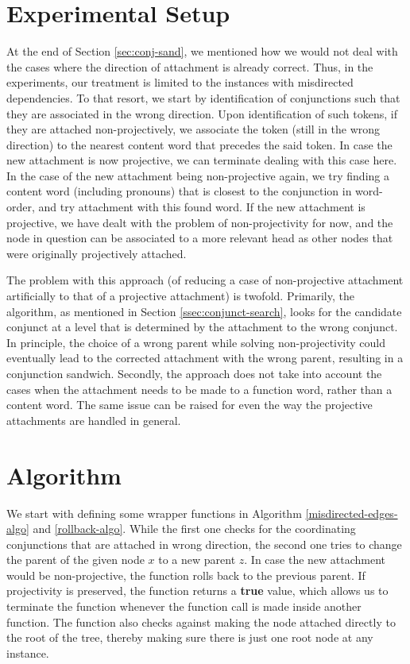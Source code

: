 \section{Experimental Setup}
\label{ssec:conj_head_experiment}

At the end of Section \ref{sec:conj-sand}, we mentioned how we would not deal with the cases where the direction of attachment is already correct. Thus, in the experiments, our treatment is limited to the instances with misdirected dependencies. To that resort, we start by identification of conjunctions such that they are associated in the wrong direction. Upon identification of such tokens, if they are attached non-projectively, we associate the token (still in the wrong direction) to the nearest content word that precedes the said token. In case the new attachment is now projective, we can terminate dealing with this case here. In the case of the new attachment being non-projective again, we try finding a content word (including pronouns) that is closest to the conjunction in word-order, and try attachment with this found word. If the new attachment is projective, we have dealt with the problem of non-projectivity for now, and the node in question can be associated to a more relevant head as other nodes that were originally projectively attached.

The problem with this approach (of reducing a case of non-projective attachment artificially to that of a projective attachment) is twofold. Primarily, the algorithm, as mentioned in Section \ref{ssec:conjunct-search}, looks for the candidate conjunct at a level that is determined by the attachment to the wrong conjunct. In principle, the choice of a wrong parent while solving non-projectivity could eventually lead to the corrected attachment with the wrong parent, resulting in a conjunction sandwich. Secondly, the approach does not take into account the cases when the attachment needs to be made to a function word, rather than a content word. The same issue can be raised for even the way the projective attachments are handled in general.

\section{Algorithm}
\label{ssec:conj_head_algorithm}

We start with defining some wrapper functions in Algorithm \ref{misdirected-edges-algo} and \ref{rollback-algo}. While the first one checks for the coordinating conjunctions that are attached in wrong direction, the second one tries to change the parent of the given node $x$ to a new parent $z$. In case the new attachment would be non-projective, the function rolls back to the previous parent. If projectivity is preserved, the function returns a \textbf{true} value, which allows us to terminate the function whenever the function call is made inside another function. The function also checks against making the node attached directly to the root of the tree, thereby making sure there is just one root node at any instance.

